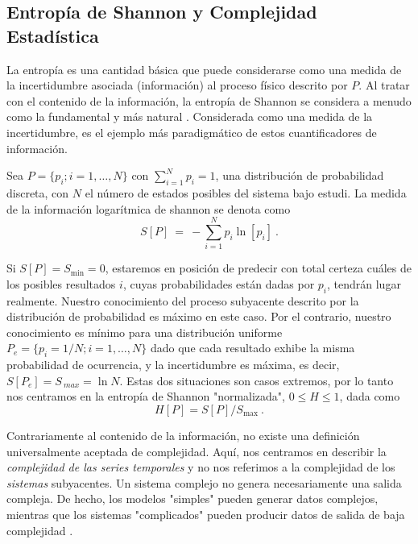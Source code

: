 \subsection{Entropía de Shannon y Complejidad Estadística}

La entropía es una cantidad básica que puede considerarse como una medida de la incertidumbre asociada (información) al proceso físico descrito por $P$.
Al tratar con el contenido de la información, la entropía de Shannon se considera a menudo como la fundamental y más natural \cite{Shannon1948}.
Considerada como una medida de la incertidumbre, es el ejemplo más paradigmático de estos cuantificadores de información.

Sea $P=\{p_i; i=1,\ldots, N\}$ con $\sum_{i=1}^N p_i = 1$, una distribución de probabilidad discreta, con $N$ el número de estados posibles del sistema bajo estudi.
La medida de la información logarítmica de shannon se denota como
\begin{equation}
\label{Shannon-disc}
S[P] ~=~ -\sum_{i=1}^{N} p_i \ln \left[ p_i \right] \ .
\end{equation}

Si $S[P] = S_{\min} = 0$, estaremos en posición de predecir con total certeza cuáles de los posibles resultados $i$, cuyas probabilidades están dadas por $p_i$, tendrán lugar realmente.
Nuestro conocimiento del proceso subyacente descrito por la distribución de probabilidad es máximo en este caso.
Por el contrario, nuestro conocimiento es mínimo para una distribución uniforme $P_e = \{p_i = 1/N; i = 1, \ldots, N \}$ dado que cada resultado exhibe la misma probabilidad de ocurrencia, y la incertidumbre es máxima, es decir, $S[P_e] = S_{\ max} = \ln N$.
Estas dos situaciones son casos extremos, por lo tanto nos centramos en la entropía de Shannon "normalizada", $0 \leq H \leq 1$, dada como
\begin{equation}
\label{shannon-disc-normalizada}
H[P] = S[P] / S_{\max} \ .
\end{equation}

Contrariamente al contenido de la información, no existe una definición universalmente aceptada de complejidad.
Aquí, nos centramos en describir la \textit{complejidad de las series temporales} y no nos referimos a la complejidad de los \textit{sistemas} subyacentes.
Un sistema complejo no genera necesariamente una salida compleja.
De hecho, los modelos "simples" pueden generar datos complejos, mientras que los sistemas "complicados" pueden producir datos de salida de baja complejidad \cite{Kantz1998}.

